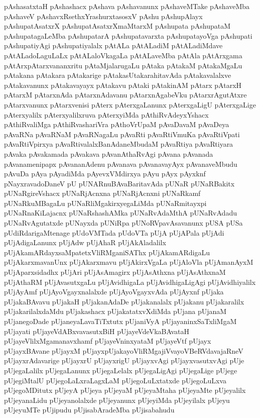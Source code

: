 {pAshasatxtaH
pAshashacx
pAshava
pAshavanunx
pAshaveMTake
pAshaveMba
pAshaveV
pAshavxRsethxYrashurxtasosxV
pAshu
pAshupAlayx
pAshupatAsatxrX
pAshupatAsatxrXmaMtarxM
pAshupata
pAshupataM
pAshupatagaLeMba
pAshupatarA
pAshupatavarxta
pAshupatayoVga
pAshupati
pAshupatiyAgi
pAshupatiyalalx
pAtALa
pAtALadiM
pAtALadiMdave
pAtALadoLaguLaLx
pAtALaloVkagaLa
pAtALaveMba
pAtAla
pAtArxgama
pAtArxpAtarxvananxritu
pAtaMjalarugaLu
pAtaka
pAtakaM
pAtakaMgaLu
pAtakana
pAtakara
pAtakarige
pAtakasUtakarahitavAda
pAtakavalalxve
pAtakavanunx
pAtakavayayx
pAtakavu
pAtaki
pAtakinAM
pAtarx
pAtarxH
pAtarxM
pAtarxnAda
pAtarxnAdavanu
pAtarxnAgabeVku
pAtarxrAgutAtxre
pAtarxvanunx
pAtarxvenisi
pAterx
pAterxgaLanunx
pAterxgaLigU
pAterxgaLige
pAterxyalilx
pAterxyalilxruva
pAterxyiMda
pAthiRvAdeyxYshacx
pAthiRvaliMga
pAthiRvashariVra
pAthoVrUpaM
pAvaDavaM
pAvaDeya
pAvaRNa
pAvaRNaM
pAvaRNagaLu
pAvaRti
pAvaRtiVmuKa
pAvaRtiVpati
pAvaRtiVpirxya
pAvaRtivalalxBanAdaneMbudaM
pAvaRtiya
pAvaRtiyara
pAvaka
pAvakamada
pAvakava
pAvanAthaRvAgi
pAvana
pAvanada
pAvanamenipapx
pAvananAdenu
pAvanava
pAvanavayAyx
pAvanaveMbudu
pAvuDa
pAya
pAyadiMda
pAyevxVMdirxya
pAyu
pAyx
pAyxknf
pNayxravadoDaneV
pU
pUNARnuBAvaBaritavAda
pUNaR
pUNaRBakitx
pUNaRgireVshacx
pUNaRjAcnxna
pUNaRjAcnxni
pUNaRkamf
pUNaRkuMBagaLu
pUNaRliMgakirxyegaLiMda
pUNaRmitayxpi
pUNaRnaKiLajacnx
pUNaRshashAMka
pUNaRvAdaMthA
pUNaRvAdadu
pUNaRvAgutatxde
pUNayxda
pUNiRpa
pUNoRVpavAsavanunx
pUSA
pUSa
pUdiRdarigaMtenage
pUdoVMTada
pUdoVTa
pUjA
pUjAPala
pUjAdi
pUjAdigaLanunx
pUjAdw
pUjAhaR
pUjAkAladalilx
pUjAkamARdayxsaMpatetxVliRMganiSAThx
pUjAkamARdigaLu
pUjAkarxmavanUnx
pUjAkarxmavu
pUjAkirxVgaLa
pUjAloVla
pUjAmanAyxM
pUjAparxsidadhx
pUjAri
pUjAsAmagirx
pUjAsAthxna
pUjAsAthxnaM
pUjAthaRM
pUjAvasutxgaLu
pUjAvidhigaLa
pUjAvidhigaLigAgi
pUjAvidhiyalilx
pUjAyAmf
pUjAyoVgayxnalalxde
pUjAyoVgayxvAda
pUjAyxnf
pUjaka
pUjakaBAvavu
pUjakaH
pUjakanAdaDe
pUjakanalalx
pUjakanu
pUjakaralilx
pUjakarilalxdaMdu
pUjakashacx
pUjakatatxvXdiMda
pUjana
pUjanaM
pUjanegoDade
pUjaneyaLavaTiTxtutx
pUjaniVyA
pUjayaninxSaTxliMgaM
pUjayati
pUjayeVdABxvavasutxBiH
pUjayeVdeVkaBAvataH
pUjayeVlilxMgamanavxhamf
pUjayeVninxyataM
pUjayeVtf
pUjayx
pUjayxBAvane
pUjayxM
pUjayxpUjakayoVliRMgajiVvayoVBeRVdavajaRneV
pUjayxrAdavarige
pUjayxrU
pUjayxrigU
pUjayxvAgi
pUjayxvasutxvAgi
pUje
pUjegaLalilx
pUjegaLanunx
pUjegaLelalx
pUjegaLigAgi
pUjegaLige
pUjege
pUjegiMtalU
pUjegoLaLxraLagxLaM
pUjegoLuLxtatxde
pUjegoLuLxva
pUjegoMDitutx
pUjeyA
pUjeya
pUjeyaM
pUjeyaMtaha
pUjeyaMte
pUjeyalilx
pUjeyanaLidu
pUjeyanolalxde
pUjeyanunx
pUjeyiMda
pUjeyilalx
pUjeyu
pUjeyuMTe
pUjipudu
pUjisabAradeMba
pUjisabahudu
}
